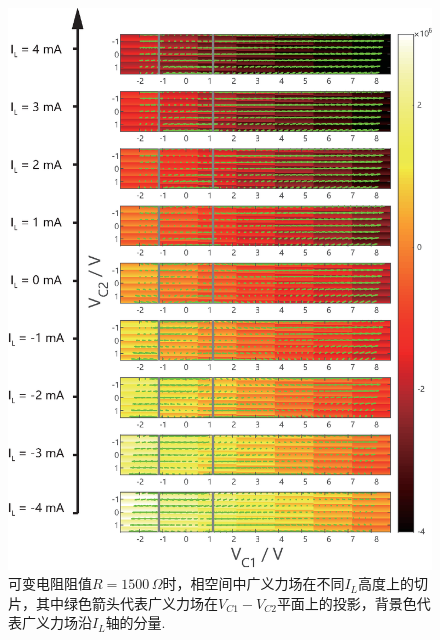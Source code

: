 \documentclass[a4paper, 10pt]{article}
\begin{document}
\begin{appendix}
\begin{figure}[H]
    \centering
    \includegraphics[width=\columnwidth]{Generalized-force-map-R=1950-modified.eps}
    \caption{可变电阻阻值$R=1500\,\Omega$时，相空间中广义力场在不同$I_L$高度上的切片，其中绿色箭头代表广义力场在$V_{C1}-V_{C2}$平面上的投影，背景色代表广义力场沿$I_L$轴的分量.}
    \label{Generalized-force-map-R=1950}
\end{figure}


\end{appendix}
\end{document}

